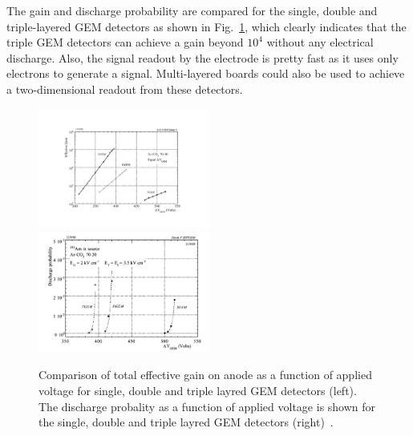 The gain and discharge probability are compared for the single, double and triple-layered GEM detectors as shown in Fig.~\ref{fig:tripleGEM_discharge_gain}, which clearly indicates that the triple GEM detectors can achieve a gain beyond $10^4$ without any electrical discharge.
Also, the signal readout by the electrode is pretty fast as it uses only electrons to generate a signal. 
Multi-layered boards could also be used to achieve a two-dimensional readout from these detectors.
\begin{figure}[!htbp]
    \centering
    \includegraphics[width=0.5\textwidth]{figures/GEM/Comp_threeGEMS_Gain.pdf}%
    \includegraphics[width=0.5\textwidth]{figures/GEM/Comp_threeGEMS_DischargeProbability.pdf}
    \caption{Comparison of total effective gain on anode as a function of applied voltage for single, double and triple layred GEM detectors (left). The discharge probality as a function of applied voltage is shown for the single, double and triple layred GEM detectors (right)~\cite{Bachmann2002}.}
    \label{fig:tripleGEM_discharge_gain}
\end{figure}

